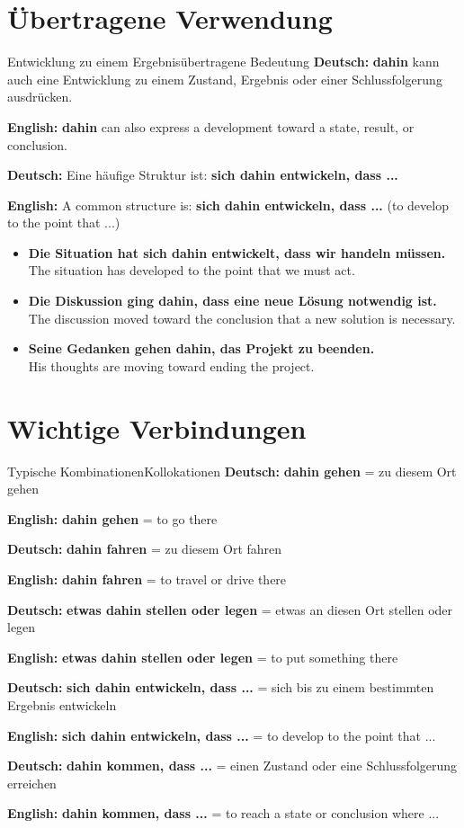\documentclass[a4paper,11pt]{article}
\newcommand{\GermanText}[1]{\textbf{Deutsch: }#1\par}
\newcommand{\EnglishText}[1]{{\small\color{SoftGray}\textbf{English: }#1\par}}
\newcommand{\ExampleItem}[2]{\item \textbf{#1}\\{\small\color{SoftGray}#2}}
\begin{document}
    
    \section{Übertragene Verwendung}
        
        \begin{grammarentry}{Entwicklung zu einem Ergebnis}{übertragene Bedeutung}
            \GermanText{\textbf{dahin} kann auch eine Entwicklung zu einem Zustand, Ergebnis oder einer Schlussfolgerung ausdrücken.}
            \EnglishText{\textbf{dahin} can also express a development toward a state, result, or conclusion.}
            
            \GermanText{Eine häufige Struktur ist: \textbf{sich dahin entwickeln, dass ...}}
            \EnglishText{A common structure is: \textbf{sich dahin entwickeln, dass ...} (to develop to the point that ...)}
        \end{grammarentry}
        
        \begin{exbox}
            \begin{itemize}
                \ExampleItem{Die Situation hat sich dahin entwickelt, dass wir handeln müssen.}{The situation has developed to the point that we must act.}
                \ExampleItem{Die Diskussion ging dahin, dass eine neue Lösung notwendig ist.}{The discussion moved toward the conclusion that a new solution is necessary.}
                \ExampleItem{Seine Gedanken gehen dahin, das Projekt zu beenden.}{His thoughts are moving toward ending the project.}
            \end{itemize}
        \end{exbox}
    
    
    \section{Wichtige Verbindungen}
        
        \begin{grammarentry}{Typische Kombinationen}{Kollokationen}
            \GermanText{\textbf{dahin gehen} = zu diesem Ort gehen}
            \EnglishText{\textbf{dahin gehen} = to go there}
            
            \GermanText{\textbf{dahin fahren} = zu diesem Ort fahren}
            \EnglishText{\textbf{dahin fahren} = to travel or drive there}
            
            \GermanText{\textbf{etwas dahin stellen oder legen} = etwas an diesen Ort stellen oder legen}
            \EnglishText{\textbf{etwas dahin stellen oder legen} = to put something there}
            
            \GermanText{\textbf{sich dahin entwickeln, dass ...} = sich bis zu einem bestimmten Ergebnis entwickeln}
            \EnglishText{\textbf{sich dahin entwickeln, dass ...} = to develop to the point that ...}
            
            \GermanText{\textbf{dahin kommen, dass ...} = einen Zustand oder eine Schlussfolgerung erreichen}
            \EnglishText{\textbf{dahin kommen, dass ...} = to reach a state or conclusion where ...}
        \end{grammarentry}
    
\end{document}

